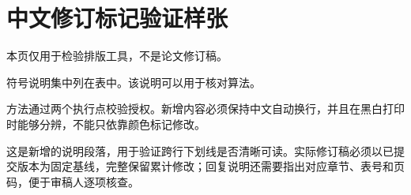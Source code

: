 \documentclass[UTF8,fontset=none]{ctexart}
\begin{document}
\section*{中文修订标记验证样张}
本页仅用于检验排版工具，不是论文修订稿。

符号说明集中列在表中。该说明可以用于核对算法。

方法通过两个执行点校验授权。新增内容必须保持中文自动换行，并且在黑白打印时能够分辨，不能只依靠颜色标记修改。

这是新增的说明段落，用于验证跨行下划线是否清晰可读。实际修订稿必须以已提交版本为固定基线，完整保留累计修改；回复说明还需要指出对应章节、表号和页码，便于审稿人逐项核查。
\end{document}
